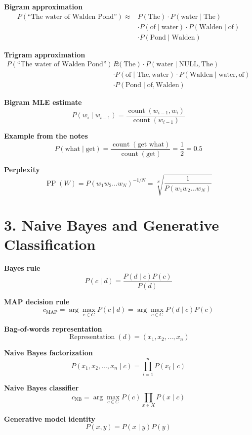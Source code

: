 \documentclass[11pt]{article}
\begin{document}
\textbf{Bigram approximation}
\[
\begin{aligned}
P(\text{``The water of Walden Pond''}) \approx {} & P(\text{The}) \cdot P(\text{water} \mid \text{The}) \\
& \cdot P(\text{of} \mid \text{water}) \cdot P(\text{Walden} \mid \text{of}) \\
& \cdot P(\text{Pond} \mid \text{Walden})
\end{aligned}
\]

\textbf{Trigram approximation}
\[
\begin{aligned}
P(\text{``The water of Walden Pond''}) \approx {} & P(\text{The}) \cdot P(\text{water} \mid \text{NULL}, \text{The}) \\
& \cdot P(\text{of} \mid \text{The}, \text{water}) \cdot P(\text{Walden} \mid \text{water}, \text{of}) \\
& \cdot P(\text{Pond} \mid \text{of}, \text{Walden})
\end{aligned}
\]

\textbf{Bigram MLE estimate}
\[
P(w_i \mid w_{i-1}) = \frac{\operatorname{count}(w_{i-1}, w_i)}{\operatorname{count}(w_{i-1})}
\]

\textbf{Example from the notes}
\[
P(\text{what} \mid \text{get}) = \frac{\operatorname{count}(\text{get what})}{\operatorname{count}(\text{get})} = \frac{1}{2} = 0.5
\]

\textbf{Perplexity}
\[
\operatorname{PP}(W) = P(w_1 w_2 \dots w_N)^{-1/N}
= \sqrt[N]{\frac{1}{P(w_1 w_2 \dots w_N)}}
\]

\section*{3. Naive Bayes and Generative Classification}

\textbf{Bayes rule}
\[
P(c \mid d) = \frac{P(d \mid c)P(c)}{P(d)}
\]

\textbf{MAP decision rule}
\[
c_{\text{MAP}} = \arg\max_{c \in C} P(c \mid d)
= \arg\max_{c \in C} P(d \mid c)P(c)
\]

\textbf{Bag-of-words representation}
\[
\operatorname{Representation}(d) = (x_1, x_2, \dots, x_n)
\]

\textbf{Naive Bayes factorization}
\[
P(x_1, x_2, \dots, x_n \mid c) = \prod_{i=1}^{n} P(x_i \mid c)
\]

\textbf{Naive Bayes classifier}
\[
c_{\text{NB}} = \arg\max_{c \in C} P(c)\prod_{x \in X} P(x \mid c)
\]

\textbf{Generative model identity}
\[
P(x, y) = P(x \mid y)P(y)
\]
\end{document}
